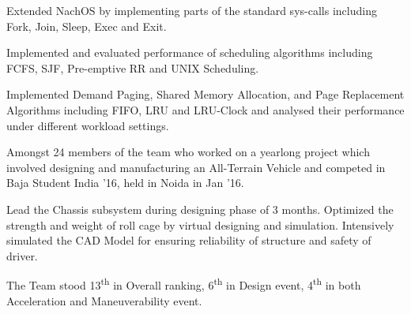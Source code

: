 \documentclass[a4paper]{norm-resume}
\begin{document}
\vspace{5mm}

 
\begin{tightitemize}
        \small
        {
        \item Extended NachOS by implementing parts of the standard sys-calls including Fork, Join, Sleep, Exec and Exit.
        \item Implemented and evaluated performance of scheduling algorithms including FCFS, SJF, Pre-emptive RR and UNIX Scheduling.
        \item Implemented Demand Paging, Shared Memory Allocation, and Page Replacement Algorithms including FIFO, LRU and LRU-Clock and analysed their performance under different workload settings.
        }
\end{tightitemize}

\vspace{5mm}

 
\begin{tightitemize}
        \small
        {
        \item Amongst 24 members of the team who worked on a yearlong project which involved designing and manufacturing an All-Terrain Vehicle and competed in Baja Student India ’16, held in Noida in Jan ’16.
        \item Lead the Chassis subsystem during designing phase of 3 months. Optimized the strength and weight of roll cage by virtual designing and simulation. Intensively simulated the CAD Model for ensuring reliability of structure and safety of driver.
        \item The Team stood 13\textsuperscript{th} in Overall ranking, 6\textsuperscript{th} in Design event, 4\textsuperscript{th} in both Acceleration and Maneuverability event.
        }
\end{tightitemize}

\vspace{5mm}

\end{document}
